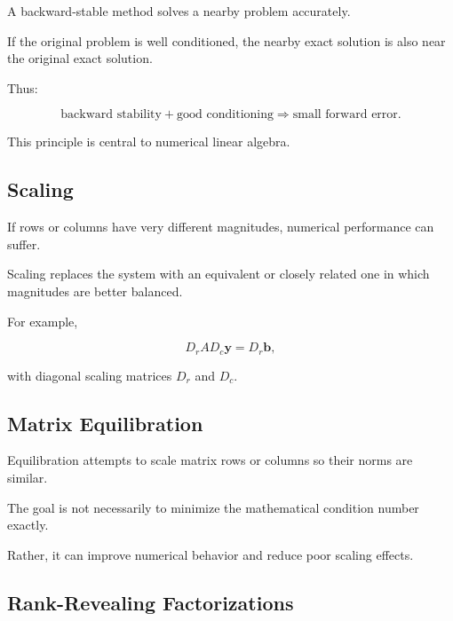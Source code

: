 A backward-stable method solves a nearby problem accurately.

If the original problem is well conditioned, the nearby exact solution is
also near the original exact solution.

Thus:

\[
\boxed{
\text{backward stability}
+
\text{good conditioning}
\Rightarrow
\text{small forward error}.
}
\]

This principle is central to numerical linear algebra.

\subsection{Scaling}
\label{subsec:matrix-scaling}

If rows or columns have very different magnitudes, numerical performance
can suffer.

Scaling replaces the system with an equivalent or closely related one in
which magnitudes are better balanced.

For example,

\[
\boxed{
D_rAD_c\mathbf{y}
=
D_r\mathbf{b},
}
\]

with diagonal scaling matrices \(D_r\) and \(D_c\).

\subsection{Matrix Equilibration}
\label{subsec:matrix-equilibration}

Equilibration attempts to scale matrix rows or columns so their norms are
similar.

The goal is not necessarily to minimize the mathematical condition number
exactly.

Rather, it can improve numerical behavior and reduce poor scaling effects.

\subsection{Rank-Revealing Factorizations}
\label{subsec:rank-revealing-factorizations}

